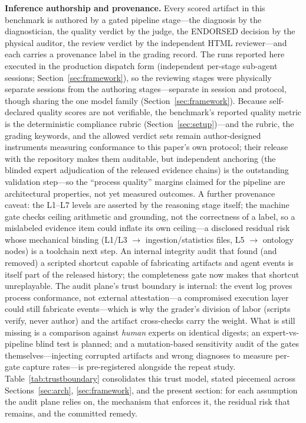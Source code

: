 \documentclass[preprint,12pt]{elsarticle}
\begin{document}
\textbf{Inference authorship and provenance.} Every scored artifact in this benchmark is authored by a gated pipeline stage---the diagnosis by the diagnostician, the quality verdict by the judge, the ENDORSED decision by the physical auditor, the review verdict by the independent HTML reviewer---and each carries a provenance label in the grading record. The runs reported here executed in the production dispatch form (independent per-stage sub-agent sessions; Section~\ref{sec:framework}), so the reviewing stages were physically separate sessions from the authoring stages---separate in session and protocol, though sharing the one model family (Section~\ref{sec:framework}). Because self-declared quality scores are not verifiable, the benchmark's reported quality metric is the deterministic compliance rubric (Section~\ref{sec:setup})---and the rubric, the grading keywords, and the allowed verdict sets remain author-designed instruments measuring conformance to this paper's own protocol; their release with the repository makes them auditable, but independent anchoring (the blinded expert adjudication of the released evidence chains) is the outstanding validation step---so the ``process quality'' margins claimed for the pipeline are architectural properties, not yet measured outcomes. A further provenance caveat: the L1--L7 levels are asserted by the reasoning stage itself; the machine gate checks ceiling arithmetic and grounding, not the correctness of a label, so a mislabeled evidence item could inflate its own ceiling---a disclosed residual risk whose mechanical binding (L1/L3 $\to$ ingestion/statistics files, L5 $\to$ ontology nodes) is a toolchain next step. An internal integrity audit that found (and removed) a scripted shortcut capable of fabricating artifacts and agent events is itself part of the released history; the completeness gate now makes that shortcut unreplayable. The audit plane's trust boundary is internal: the event log proves process conformance, not external attestation---a compromised execution layer could still fabricate events---which is why the grader's division of labor (scripts verify, never author) and the artifact cross-checks carry the weight. What is still missing is a comparison against \emph{human} experts on identical digests; an expert-vs-pipeline blind test is planned; and a mutation-based sensitivity audit of the gates themselves---injecting corrupted artifacts and wrong diagnoses to measure per-gate capture rates---is pre-registered alongside the repeat study. Table~\ref{tab:trustboundary} consolidates this trust model, stated piecemeal across Sections~\ref{sec:arch}, \ref{sec:framework}, and the present section: for each assumption the audit plane relies on, the mechanism that enforces it, the residual risk that remains, and the committed remedy.
\end{document}
